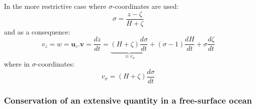 In the more restrictive case where $\sigma$-coordinates are used:
\begin{equation}
 \displaystyle
 \sigma=\frac{z-\zeta}{H+\zeta}
\end{equation}
and as a consequence:
\begin{equation}
 \displaystyle
 v_z=w=\mathbf{u}_z.\mathbf{v}
=\frac{dz}{dt}=\underbrace{(H+\zeta)\frac{d\sigma}{dt}}_{\equiv v_{\sigma}}
 +(\sigma-1)\frac{dH}{dt}
 +\sigma\frac{d\zeta}{dt}
\end{equation}
where in $\sigma$-coordinates:
\begin{equation}
 \displaystyle
v_{\sigma}=(H+\zeta)\frac{d\sigma}{dt}
\end{equation}

\subsubsection{Conservation of an extensive quantity in a free-surface ocean}

